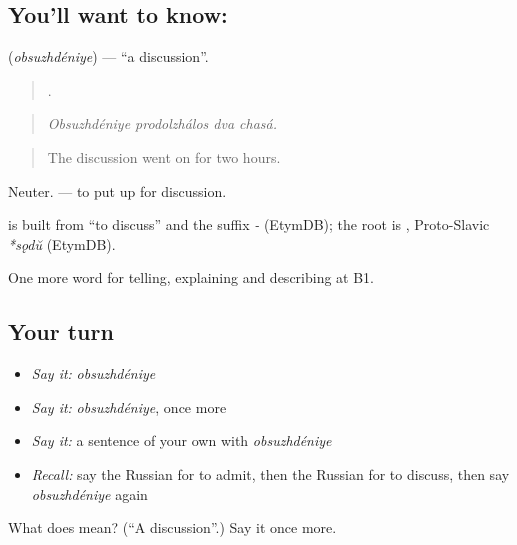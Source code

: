 \subsection*{You'll want to know: }
\textbf{} (\emph{obsuzhdéniye}) — \textquotedblleft{}a discussion\textquotedblright{}.

\begin{quote}
   .
\end{quote}

\begin{quote}
\emph{Obsuzhdéniye prodolzhálos dva chasá.}
\end{quote}

\begin{quote}
The discussion went on for two hours.
\end{quote}

Neuter. \emph{  } — to put up for discussion.

\begin{cousinweb}
\textbf{} is built from \emph{} \textquotedblleft{}to discuss\textquotedblright{} and the suffix \emph{-} (EtymDB); the root is \emph{}, Proto-Slavic \emph{*sǫdŭ} (EtymDB).
\end{cousinweb}

\begin{grammarlens}[title={What you've built}]
One more word for telling, explaining and describing at B1.
\end{grammarlens}

\subsection*{Your turn}
\begin{itemize}
\raggedright
  \item \emph{Say it:} \emph{obsuzhdéniye}
  \item \emph{Say it:} \emph{obsuzhdéniye}, once more
  \item \emph{Say it:} a sentence of your own with \emph{obsuzhdéniye}
  \item \emph{Recall:} say the Russian for to admit, then the Russian for to discuss, then say \emph{obsuzhdéniye} again
\end{itemize}

\begin{tcolorbox}[breakable,colback=teal!4,colframe=teal!35!black,title={Before you move on}]
What does  mean? (\textquotedblleft{}A discussion\textquotedblright{}.) Say it once more.
\end{tcolorbox}
